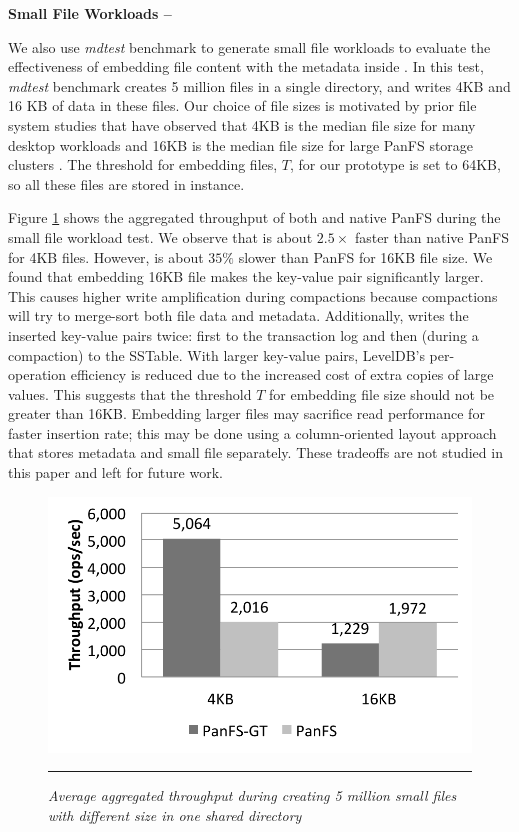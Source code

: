 \textbf{Small File Workloads -- }

We also use {\it mdtest} benchmark to generate small file workloads to evaluate
the effectiveness of embedding file content with the metadata inside \tfs.
In this test, {\it mdtest} benchmark creates 5 million files in 
a single directory, and writes 4KB and 16 KB of data in these files. Our choice
of file sizes is motivated by prior file system studies that have observed
that 4KB is the median file size for many desktop workloads \cite{Bill11}
and 16KB is the median file size for large PanFS storage clusters \cite{brent13}.
The threshold for embedding files, $T$, for our prototype is set to 64KB, so all 
these files are stored in \tfs instance.

Figure \ref{graph:smallfiles} shows the aggregated throughput of both \psys and
native PanFS during the small file workload test.
We observe that \psys is about $2.5\times$ faster than native PanFS for 4KB
files.
However, \psys is about $35\%$ slower than PanFS for 16KB file size.
We found that embedding 16KB file makes the key-value pair significantly larger.
This causes higher write amplification during \ldb compactions because
\ldb compactions will try to merge-sort both file data and metadata.
Additionally, \ldb writes the inserted key-value pairs twice: first
to the transaction log and then (during a compaction) to the SSTable.
With larger key-value pairs, LevelDB's per-operation efficiency is reduced due
to the increased cost of extra copies of large values.
This suggests that the threshold $T$ for embedding file size should not be
greater than 16KB. Embedding larger files may sacrifice read performance for
faster insertion rate; this may be done using a column-oriented layout approach 
that stores metadata and small file separately.
These tradeoffs are not studied in this paper and left for future work.

\begin{figure}[t]  %
\centerline{\includegraphics[scale=0.7]{./figs/small_file_creates}}
\vspace{10pt}
\caption{\footnotesize
\textit{Average aggregated throughput during creating 5 million small files
with different size in one shared directory}
}
\hrule
\label{graph:smallfiles}
\end{figure}       %


